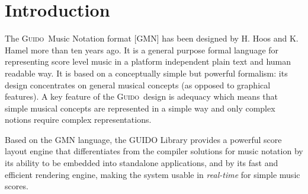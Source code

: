 \documentclass[twoside,10pt,a4paper]{article}
\affiliation{}{}
\title{\papertitle}
\newcommand{\Guido}	{\textsc{Guido}}
\begin{document}
    
\maketitle

\begin{abstract}
Based on the Guido Music Notation format, we have developed tools for music score composition, i.e. operators taking score both as target and as arguments of high level transformations applicable for example to the time domain (e.g. cutting the head or the tail of a score) or to the structural domains (e.g. putting scores in sequence or in parallel). 
Providing these operations at the score level is particularly convenient to express music ideas and to compose these ideas in an homogeneous representation space. However, scores composition gives raise to a set of issues related to the music notation consistency. The paper introduces the Guido Music Notation format, presents the score composition operations, the notation issues and a proposal to solve them.
\end{abstract}


\section{Introduction}\label{sec:intro}
The \Guido\ Music Notation format [GMN] \cite{hoos98} has been designed by H. Hoos and K. Hamel more than ten years ago. It is a general purpose formal language for representing score level music in a platform independent plain text and human readable way. It is based on a conceptually simple but powerful formalism: its design concentrates on general musical concepts (as opposed to graphical features). A key feature of the \Guido\ design is adequacy which means that simple musical concepts are represented in a simple way and only complex notions require complex representations.

Based on the GMN language, the GUIDO Library \cite{daudin09a,Fober:04b} provides a powerful score layout engine that differentiates from the compiler solutions for music notation \cite{lilypond03,musixtex} by its ability to be embedded into standalone applications, and by its fast and efficient rendering engine, making the system usable in \emph{real-time} for simple music scores.
\end{document}
